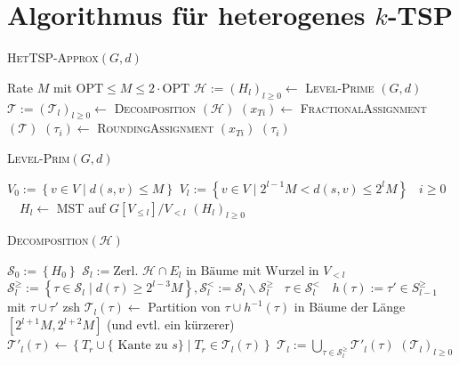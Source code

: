 \documentclass[a4paper,ngerman,12pt,bibtotoc]{scrartcl}
\newcommand{\LineFor}[2]{\State\algorithmicfor\ {#1}\ \algorithmicdo\ {#2}}
\theoremstyle{definition}
\theoremstyle{plain}
\theoremstyle{remark}
\newcommand{\Hc}{\mathcal{H}}
\newcommand{\Tc}{\mathcal{T}}
\newcommand{\Sc}{\mathcal{S}}
\newcommand{\OPT}{\mathrm{OPT}}
\begin{document}
	\hrulefill
			
	{
		\renewcommand{\section}[2]{}
		\renewcommand*{\bibfont}{\tiny}
		\nocite{*}
		\printbibliography		
	}		
		
	\section*{Algorithmus für heterogenes $k$-TSP}\footnotesize
	
	\begin{minipage}{0.5\textwidth}
		\begin{algorithm}[H]\footnotesize
			\caption{\small \textsc{HetTSP-Approx}$(G, d)$}\label{AlgHetTSP}
			\begin{algorithmic}[1]
				\State Rate $M$ mit $\OPT \leq M \leq 2\cdot\OPT$
				\State $\Hc := \left(H_l\right)_{l\geq 0} \gets$ \textsc{Level-Prime} $\left(G, d\right)$
				\State $\Tc := \left(\Tc_l\right)_{l\geq 0} \gets$ \textsc{Decomposition} $\left(\Hc\right)$
				\State $\left(x_{Ti}\right) \gets$ \textsc{FractionalAssignment}  $\left(\Tc\right)$
				\State $\left(\tau_i\right) \gets$ \textsc{RoundingAssignment} $\left(x_{Ti}\right)$
				\State \Return $\left(\tau_i\right)$
			\end{algorithmic}
		\end{algorithm}
		
		\begin{algorithm}[H]\footnotesize
			\caption{\small\textsc{Level-Prim}$(G, d)$}\label{AlgLevelPrim}
			\begin{algorithmic}[1]
				\State $V_0 := \left\lbrace v\in V \mid d(s,v) \leq M\right\rbrace$
				\State $V_l := \left\lbrace v \in V \mid 2^{l-1}M < d(s,v) \leq 2^l M\right\rbrace$
				\LineFor{$i\geq 0$}{$H_l \gets$ MST auf $G\left[V_{\leq l}\right]/V_{<l}$}
				\State \Return $\left(H_l\right)_{l\geq 0}$
			\end{algorithmic}
		\end{algorithm}	
		
		\begin{algorithm}[H]\footnotesize
			\caption{\small \textsc{Decomposition}$\left(\Hc\right)$}\label{AlgDecomposition}
			\begin{algorithmic}[1]
				\State $\Sc_0 := \left\lbrace H_0 \right\rbrace$
				\State $\Sc_l := \text{Zerl. } \Hc\cap E_l \text{ in Bäume mit Wurzel in } V_{<l}$
				\State $\Sc_l^{\geq} := \left\{\tau \in \Sc_l \mid d(\tau) \geq 2^{l-3}M\right\}, \Sc_l^< := \Sc_l \backslash \Sc_l^{\geq}$
				\LineFor{$\tau \in \Sc_l^{<}$}{$h(\tau) := \tau' \in S_{l-1}^{\geq}$ mit $\tau \cup \tau'$ zsh}
				\For{$\tau \in \Sc_l^{\geq}$}
				\State $\Tc_l(\tau) \gets$ Partition von $\tau \cup h^{-1}(\tau)$ in Bäume der Länge $\left[2^{l+1}M, 2^{l+2}M\right]$ (und evtl. ein kürzerer)
				\State $\Tc'_l(\tau) \gets \left\{T_r \cup \{\text{ Kante zu } s\} \mid T_r \in \Tc_l(\tau)\right\}$
				\EndFor
				\State $\Tc_l := \bigcup_{\tau \in \Sc_l^{\geq}}\Tc'_l(\tau)$
				\State \Return $\left(\Tc_l\right)_{l\geq 0}$
			\end{algorithmic}
		\end{algorithm}
		

\end{minipage}
\end{document}
